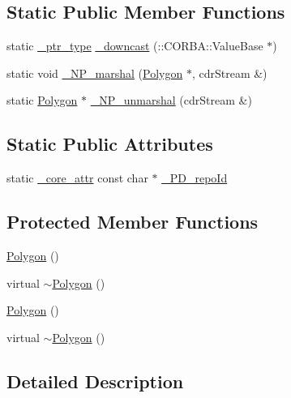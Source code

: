 \subsection*{Static Public Member Functions}
\begin{DoxyCompactItemize}
\item 
static \hyperlink{class_draw_a5164256572b3c4123ceecd1897c248dd}{\+\_\+ptr\+\_\+type} \hyperlink{class_polygon_ac866909cd0f37369c8b9a9367faeb72d}{\+\_\+downcast} (\+::C\+O\+R\+B\+A\+::\+Value\+Base $\ast$)
\item 
static void \hyperlink{class_polygon_a8ccbe5c3f82a1095d4c7a772ff5b8918}{\+\_\+\+N\+P\+\_\+marshal} (\hyperlink{class_polygon}{Polygon} $\ast$, cdr\+Stream \&)
\item 
static \hyperlink{class_polygon}{Polygon} $\ast$ \hyperlink{class_polygon_a1a84fd2c1473ceb918f5cfa2bebdbcc5}{\+\_\+\+N\+P\+\_\+unmarshal} (cdr\+Stream \&)
\end{DoxyCompactItemize}
\subsection*{Static Public Attributes}
\begin{DoxyCompactItemize}
\item 
static \hyperlink{_petit_prince_8hpp_a5f7bf7cddb608c2aad7c95f55f8a33c5}{\+\_\+core\+\_\+attr} const char $\ast$ \hyperlink{class_polygon_a3a8f0f25cfccaaf86f64f226442a6a08}{\+\_\+\+P\+D\+\_\+repo\+Id}
\end{DoxyCompactItemize}
\subsection*{Protected Member Functions}
\begin{DoxyCompactItemize}
\item 
\hyperlink{class_polygon_ac183e712f8be1e13f1c9d5b4d4512ead}{Polygon} ()
\item 
virtual \hyperlink{class_polygon_a873f9acee059f717277b6414102dab16}{$\sim$\+Polygon} ()
\item 
\hyperlink{class_polygon_ac183e712f8be1e13f1c9d5b4d4512ead}{Polygon} ()
\item 
virtual \hyperlink{class_polygon_a873f9acee059f717277b6414102dab16}{$\sim$\+Polygon} ()
\end{DoxyCompactItemize}


\subsection{Detailed Description}


